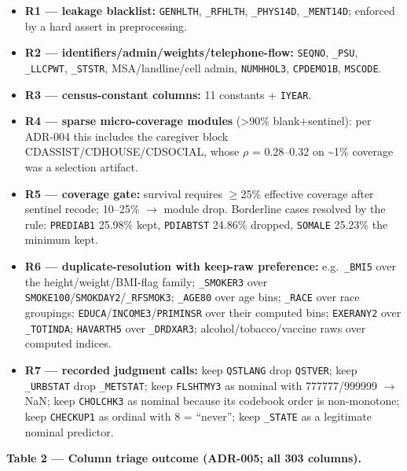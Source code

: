 \documentclass[11pt,a4paper]{article}
\providecommand{\tightlist}{\setlength{\itemsep}{2pt}\setlength{\parskip}{0pt}}
\begin{document}
\begin{itemize}
\tightlist
\item
  \textbf{R1 --- leakage blacklist:} \texttt{GENHLTH},
  \texttt{\_RFHLTH}, \texttt{\_PHYS14D}, \texttt{\_MENT14D}; enforced by
  a hard assert in preprocessing.
\item
  \textbf{R2 --- identifiers/admin/weights/telephone-flow:}
  \texttt{SEQNO}, \texttt{\_PSU}, \texttt{\_LLCPWT}, \texttt{\_STSTR},
  MSA/landline/cell admin, \texttt{NUMHHOL3}, \texttt{CPDEMO1B},
  \texttt{MSCODE}.
\item
  \textbf{R3 --- census-constant columns:} 11 constants +
  \texttt{IYEAR}.
\item
  \textbf{R4 --- sparse micro-coverage modules} (\textgreater90\%
  blank+sentinel): per ADR-004 this includes the caregiver block
  CDASSIST/CDHOUSE/CDSOCIAL, whose \textbar $\rho$\textbar{} = 0.28--0.32 on
  \textasciitilde1\% coverage was a selection artifact.
\item
  \textbf{R5 --- coverage gate:} survival requires $\ge$25\% effective
  coverage after sentinel recode; 10--25\% $\rightarrow$ module drop. Borderline
  cases resolved by the rule: \texttt{PREDIAB1} 25.98\% kept,
  \texttt{PDIABTST} 24.86\% dropped, \texttt{SOMALE} 25.23\% the minimum
  kept.
\item
  \textbf{R6 --- duplicate-resolution with keep-raw preference:}
  e.g.~\texttt{\_BMI5} over the height/weight/BMI-flag family;
  \texttt{\_SMOKER3} over
  \texttt{SMOKE100}/\texttt{SMOKDAY2}/\texttt{\_RFSMOK3};
  \texttt{\_AGE80} over age bins; \texttt{\_RACE} over race groupings;
  \texttt{EDUCA}/\texttt{INCOME3}/\texttt{PRIMINSR} over their computed
  bins; \texttt{EXERANY2} over \texttt{\_TOTINDA}; \texttt{HAVARTH5}
  over \texttt{\_DRDXAR3}; alcohol/tobacco/vaccine raws over computed
  indices.
\item
  \textbf{R7 --- recorded judgment calls:} keep \texttt{QSTLANG} drop
  \texttt{QSTVER}; keep \texttt{\_URBSTAT} drop \texttt{\_METSTAT}; keep
  \texttt{FLSHTMY3} as nominal with 777777/999999 $\rightarrow$ NaN; keep
  \texttt{CHOLCHK3} as nominal because its codebook order is
  non-monotone; keep \texttt{CHECKUP1} as ordinal with 8 = ``never'';
  keep \texttt{\_STATE} as a legitimate nominal predictor.
\end{itemize}

\textbf{Table 2 --- Column triage outcome (ADR-005; all 303 columns).}
\end{document}
